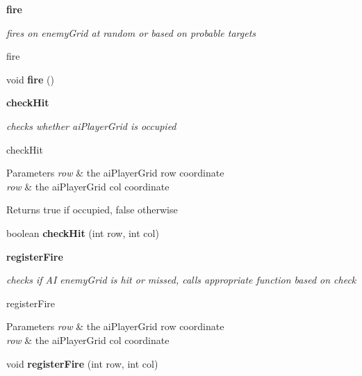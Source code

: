 \begin{Indent}{\bf fire}\par
{\em fires on enemy\+Grid at random or based on probable targets

fire }\begin{DoxyCompactItemize}
\item 
\hypertarget{classbattleship_1_1network_1_1AIPlayer_ab8232987875c1f713151b7579f4fd758}{}void {\bfseries fire} ()\label{classbattleship_1_1network_1_1AIPlayer_ab8232987875c1f713151b7579f4fd758}

\end{DoxyCompactItemize}
\end{Indent}
\begin{Indent}{\bf check\+Hit}\par
{\em checks whether ai\+Player\+Grid is occupied

check\+Hit


\begin{DoxyParams}{Parameters}
{\em row} & the ai\+Player\+Grid row coordinate \\
\hline
{\em row} & the ai\+Player\+Grid col coordinate \\
\hline
\end{DoxyParams}
\begin{DoxyReturn}{Returns}
true if occupied, false otherwise 
\end{DoxyReturn}
}\begin{DoxyCompactItemize}
\item 
\hypertarget{classbattleship_1_1network_1_1AIPlayer_a9c6a0c8fcdd661c4b941215933a786b7}{}boolean {\bfseries check\+Hit} (int row, int col)\label{classbattleship_1_1network_1_1AIPlayer_a9c6a0c8fcdd661c4b941215933a786b7}

\end{DoxyCompactItemize}
\end{Indent}
\begin{Indent}{\bf register\+Fire}\par
{\em checks if A\+I enemy\+Grid is hit or missed, calls appropriate function based on check

register\+Fire


\begin{DoxyParams}{Parameters}
{\em row} & the ai\+Player\+Grid row coordinate \\
\hline
{\em row} & the ai\+Player\+Grid col coordinate \\
\hline
\end{DoxyParams}
}\begin{DoxyCompactItemize}
\item 
\hypertarget{classbattleship_1_1network_1_1AIPlayer_ab64057dd37c05518f4c451e1ca496c03}{}void {\bfseries register\+Fire} (int row, int col)\label{classbattleship_1_1network_1_1AIPlayer_ab64057dd37c05518f4c451e1ca496c03}

\end{DoxyCompactItemize}
\end{Indent}
